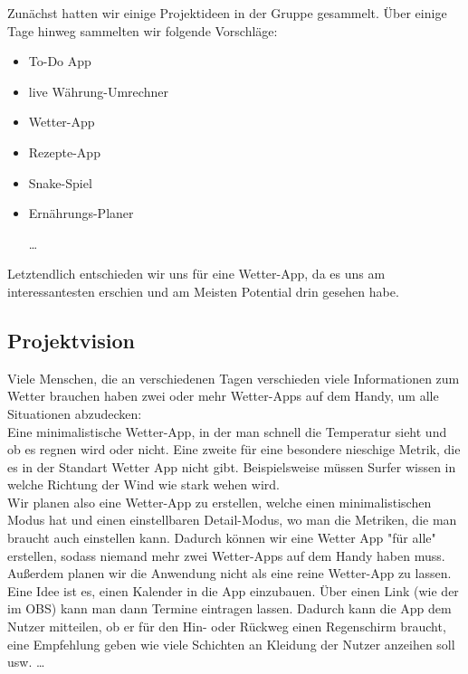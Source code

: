 \documentclass[12pt,a4paper]{scrartcl}
\begin{document}
Zunächst hatten wir einige Projektideen in der Gruppe gesammelt. Über einige Tage hinweg sammelten wir folgende Vorschläge:
\begin{itemize}
\item To-Do App

\item live Währung-Umrechner

\item Wetter-App

\item Rezepte-App

\item Snake-Spiel

\item Ernährungs-Planer

\item [\dots]
\end{itemize}

Letztendlich entschieden wir uns für eine Wetter-App, da es uns am interessantesten erschien und am Meisten Potential drin gesehen habe.

\subsection{Projektvision}

Viele Menschen, die an verschiedenen Tagen verschieden viele Informationen zum Wetter brauchen haben zwei oder mehr Wetter-Apps auf dem Handy, um alle Situationen abzudecken: \\
Eine minimalistische Wetter-App, in der man schnell die Temperatur sieht und ob es regnen wird oder nicht. Eine zweite für eine besondere nieschige Metrik, die es in der Standart Wetter App nicht gibt. Beispielsweise müssen Surfer wissen in welche Richtung der Wind wie stark wehen wird. \\
Wir planen also eine Wetter-App zu erstellen, welche einen minimalistischen Modus hat und einen einstellbaren Detail-Modus, wo man die Metriken, die man braucht auch einstellen kann. Dadurch können wir eine Wetter App "für alle" erstellen, sodass niemand mehr zwei Wetter-Apps auf dem Handy haben muss.\\

Außerdem planen wir die Anwendung nicht als eine reine Wetter-App zu lassen. Eine Idee ist es, einen Kalender in die App einzubauen. Über einen Link (wie der im OBS) kann man dann Termine eintragen lassen. Dadurch kann die App dem Nutzer mitteilen, ob er für den Hin- oder Rückweg einen Regenschirm braucht, eine Empfehlung geben wie viele Schichten an Kleidung der Nutzer anzeihen soll usw. \dots 
\end{document}

